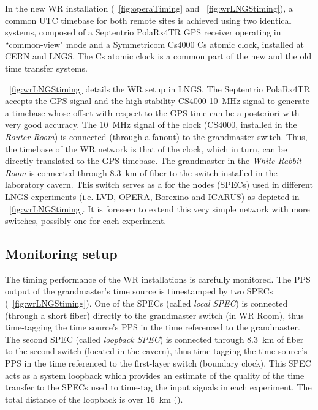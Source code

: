 In the new WR installation (\figurename~\ref{fig:operaTiming} and \figurename~\ref{fig:wrLNGStiming}), 
a common UTC timebase for both remote sites is achieved using two 
identical systems, composed of a Septentrio PolaRx4TR \cite{biblio:PolaRx4e} GPS receiver 
operating in ``common-view" mode and a Symmetricom Cs4000 \cite{biblio:CS4000} Cs atomic clock, 
installed at CERN and LNGS. The Cs atomic clock is a common part of the new and the old 
time transfer systems. 

\figurename~\ref{fig:wrLNGStiming} details the WR setup in LNGS. The Septentrio PolaRx4TR 
accepts the GPS signal and the high stability CS4000 10~MHz signal to generate a timebase whose 
offset with respect to the GPS time can be  
a posteriori with very good accuracy. 
The 10~MHz signal of the  clock (CS4000, installed in the {\it Router Room}) 
is connected (through a fanout) to the 
grandmaster switch. Thus, the timebase of the WR network is that of the   clock, 
which in turn, 
can be directly translated to the GPS timebase. The grandmaster in the {\it White Rabbit Room} 
is connected through 8.3~km of fiber to the switch installed in the laboratory cavern. 
This switch serves as a 
for the nodes (SPECs) used in different LNGS experiments (i.e. LVD, 
OPERA, Borexino and ICARUS) as depicted in \figurename~\ref{fig:wrLNGStiming}. 
It is foreseen to extend this very simple network with more switches, possibly 
one for each experiment. 


\subsection{Monitoring setup}

The timing performance of the WR installations is carefully monitored.
The PPS output 
of the grandmaster's time source is timestamped by two SPECs 
(\figurename~\ref{fig:wrLNGStiming}). One of the 
SPECs (called \textit{local SPEC}) is connected (through a short fiber) directly to the grandmaster switch (in WR Room), 
thus time-tagging the time source's PPS in 
the time referenced to the grandmaster. The second SPEC (called \textit{loopback SPEC}) 
is connected through 8.3~km of fiber to the 
second switch (located in the cavern), thus time-tagging the time source's PPS in the time 
referenced to the first-layer switch (boundary clock). This SPEC acts as a system loopback which 
provides an estimate of the quality of the time transfer to the SPECs used to time-tag
the input signals in each experiment. The total distance of the loopback is over 16~km 
(). 


